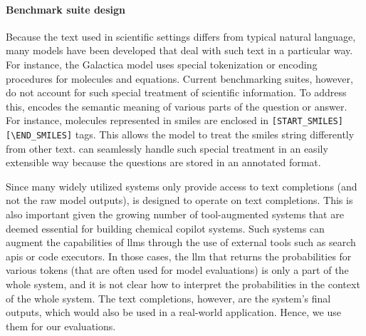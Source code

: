 \documentclass[11pt, oneside]{article}
\begin{document}
\begin{refsection}
\paragraph{Benchmark suite design} Because the text used in scientific settings differs from typical natural language, many models have been developed that deal with such text in a particular way.
For instance, the Galactica model\autocite{taylor2022galactica} uses special tokenization or encoding procedures for molecules and equations. 
Current benchmarking suites, however, do not account for such special treatment of scientific information.
To address this, \chembench encodes the semantic meaning of various parts of the question or answer.  
For instance, molecules represented in \gls{smiles} are enclosed in \texttt{[START\_SMILES][\textbackslash END\_SMILES]} tags. 
This allows the model to treat the \gls{smiles} string differently from other text. 
\chembench can seamlessly handle such special treatment in an easily extensible way because the questions are stored in an annotated format.

Since many widely utilized systems only provide access to text completions (and not the raw model outputs), \chembench is designed to operate on text completions.
This is also important given the growing number of tool-augmented systems that are deemed essential for building chemical copilot systems.
Such systems can augment the capabilities of \glspl{llm} through the use of external tools such as search \glspl{api} or code executors.\autocite{schick2024toolformer, karpas2022mrkl, yao2022react}
In those cases, the \gls{llm} that returns the probabilities for various tokens (that are often used for model evaluations\autocite{Fourrier_Habib_Launay_Wolf}) is only a part of the whole system, and it is not clear how to interpret the probabilities in the context of the whole system.
The text completions, however, are the system's final outputs, which would also be used in a real-world application. 
Hence, we use them for our evaluations.


\end{refsection}
\end{document}

